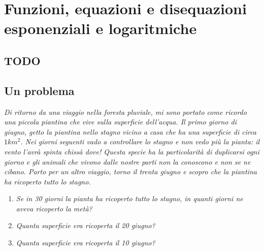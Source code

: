 


\chapter[Esponenziali e logaritmi]{Funzioni, equazioni e disequazioni 
esponenziali e logaritmiche}
        

\section{TODO}

\section{Un problema}
\label{sec:esplog_problemi}

\emph{
Di ritorno da una viaggio nella foresta pluviale, mi sono portato come ricordo 
una piccola piantina che vive sulla superficie dell'acqua. 
Il primo giorno di giugno, getto la piantina nello stagno vicino a casa che ha 
una superficie di circa \(1km^2\).
Nei giorni seguenti vado a controllare lo stagno e non vedo più la pianta: il 
vento l'avrà spinta chissà dove! 
Questa specie ha la particolarità di duplicarsi ogni giorno e gli animali che 
vivono dalle nostre parti non la conoscono e non se ne cibano.
Parto per un altro viaggio, torno il trenta giugno e scopro che la piantina 
ha ricoperto tutto lo stagno.}

\begin{enumerate}
 \item
\emph{Se in 30 giorni la pianta ha ricoperto tutto lo stagno, in quanti giorni 
ne aveva ricoperto la metà?}
 \item 
\emph{Quanta superficie era ricoperta il 20 giugno?}
 \item 
\emph{Quanta superficie era ricoperta il 10 giugno?}
\end{enumerate}

